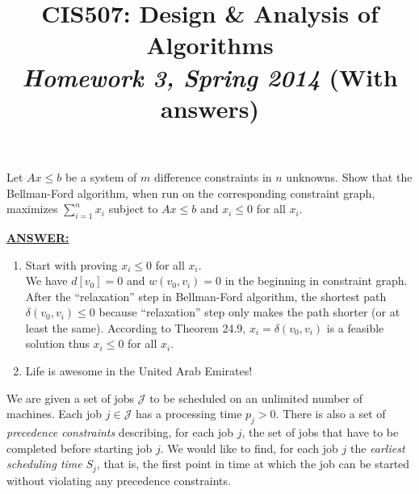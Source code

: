 \documentclass{article}
\begin{document}
\title{CIS507: Design \& Analysis of Algorithms\\\emph{Homework 3,
    Spring 2014} (With answers)} 


\date{}

\maketitle

Let $Ax\le b$ be a system of $m$ difference constraints in $n$ unknowns.
 Show that the Bellman-Ford algorithm, when run on the corresponding
 constraint graph, maximizes $\sum_{i=1}^nx_i$ subject to $Ax\le b$
 and $x_i\leq 0$ for all $x_{i}$. 

\medskip
\noindent \underline{\textbf{ANSWER:}}
\begin{enumerate}
\item Start with proving $x_{i}\leq 0$ for all $x_{i}$.\\
  We have $d[v_{0}]=0$ and $w(v_{0},v_{i})=0$ in the beginning in
  constraint graph. After the ``relaxation'' step in Bellman-Ford
  algorithm, the shortest path $\delta(v_{0},v_{i})\leq 0$ because
  ``relaxation'' step only makes the path shorter (or at least the
  same). According to Theorem 24.9, $x_{i}=\delta(v_{0},v_{i})$ is a
  feasible solution thus $x_{i}\leq 0$ for all $x_{i}$.
\item Life is awesome in the United Arab Emirates!

\end{enumerate}


\medskip

 We are given a set of jobs $\mathcal{J}$ to be
scheduled on an unlimited number of machines. Each job $j\in
\mathcal{J}$ has a processing time $p_j> 0$. There is also a set of
{\it precedence constraints} describing, for each job $j$, the set of
jobs that have to be completed before starting job $j$. We would like
to find, for each job $j$ the {\it earliest scheduling time} $S_j$,
that is, the first point in time at which the job can be started
without violating any precedence constraints. 
\end{document}
